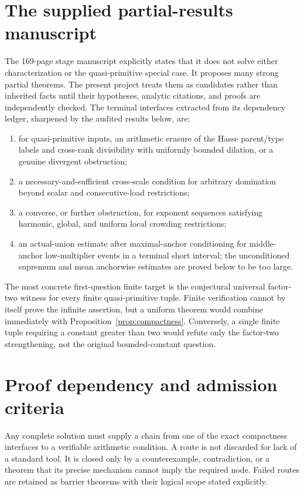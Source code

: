 \documentclass[11pt]{article}
\theoremstyle{definition}
\theoremstyle{remark}
\begin{document}
\section{The supplied partial-results manuscript}

The 169-page stage manuscript \cite{Stage2026} explicitly states that it does not solve
either characterization or the quasi-primitive special case.  It proposes many strong
partial theorems.  The present project treats them as candidates rather than inherited
facts until their hypotheses, analytic citations, and proofs are independently checked.
The terminal interfaces extracted from its dependency ledger, sharpened by the audited
results below, are:

\begin{enumerate}
\item for quasi-primitive inputs, an arithmetic erasure of the Hasse parent/type
      labels and cross-rank divisibility with uniformly bounded dilation, or a genuine
      divergent obstruction;
\item a necessary-and-sufficient cross-scale condition for arbitrary domination beyond
      scalar and consecutive-load restrictions;
\item a converse, or further obstruction, for exponent sequences satisfying harmonic,
      global, and uniform local crowding restrictions;
\item an actual-union estimate after maximal-anchor conditioning for middle-anchor
      low-multiplier events in a terminal short interval; the unconditioned supremum
      and mean anchorwise estimates are proved below to be too large.
\end{enumerate}

The most concrete first-question finite target is the conjectural universal factor-two
witness for every finite quasi-primitive tuple.  Finite verification cannot by itself
prove the infinite assertion, but a uniform theorem would combine immediately with
Proposition~\ref{prop:compactness}.  Conversely, a single finite tuple requiring a
constant greater than two would refute only the factor-two strengthening, not the
original bounded-constant question.



\section{Proof dependency and admission criteria}

Any complete solution must supply a chain from one of the exact compactness interfaces
to a verifiable arithmetic condition.  A route is not discarded for lack of a standard
tool.  It is closed only by a counterexample, contradiction, or a theorem that its
precise mechanism cannot imply the required node.  Failed routes are retained as
barrier theorems with their logical scope stated explicitly.
\end{document}

